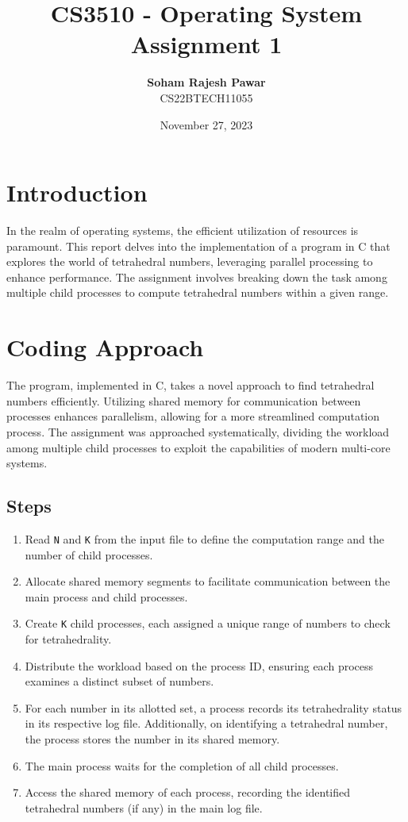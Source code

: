 \documentclass{article}
\title{\textbf{CS3510 - Operating System}\\Assignment 1}
\author{\textbf{Soham Rajesh Pawar}\\CS22BTECH11055}
\date{November 27, 2023}
\begin{document}
\maketitle

\section{Introduction}
{\large In the realm of operating systems, the efficient utilization of resources is paramount. This report delves into the implementation of a program in C that explores the world of tetrahedral numbers, leveraging parallel processing to enhance performance. The assignment involves breaking down the task among multiple child processes to compute tetrahedral numbers within a given range.
}
\section{Coding Approach}
{\large
The program, implemented in C, takes a novel approach to find tetrahedral numbers efficiently. Utilizing shared memory for communication between processes enhances parallelism, allowing for a more streamlined computation process. The assignment was approached systematically, dividing the workload among multiple child processes to exploit the capabilities of modern multi-core systems.
}
\subsection{Steps}
\begin{enumerate}
  \item{Read \texttt{N} and \texttt{K} from the input file to define the computation range and the number of child processes.}
  \item{Allocate shared memory segments to facilitate communication between the main process and child processes.}
  \item{Create \texttt{K} child processes, each assigned a unique range of numbers to check for tetrahedrality.}
  \item{Distribute the workload based on the process ID, ensuring each process examines a distinct subset of numbers.}
  \item{For each number in its allotted set, a process records its tetrahedrality status in its respective log file. Additionally, on identifying a tetrahedral number, the process stores the number in its shared memory.}
  \item{The main process waits for the completion of all child processes.}
  \item{Access the shared memory of each process, recording the identified tetrahedral numbers (if any) in the main log file.}
\end{enumerate}
\end{document}
